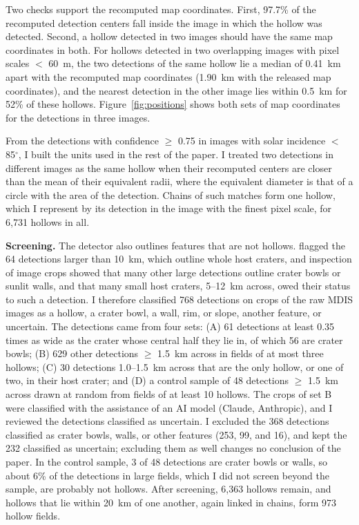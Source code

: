 \documentclass{planetary}
\begin{document}
Two checks support the recomputed map coordinates. First, 97.7\% of the recomputed detection centers fall inside the image in which the hollow was detected. Second, a hollow detected in two images should have the same map coordinates in both. For hollows detected in two overlapping images with pixel scales $<$ 60~m, the two detections of the same hollow lie a median of 0.41~km apart with the recomputed map coordinates (1.90~km with the released map coordinates), and the nearest detection in the other image lies within 0.5~km for 52\% of these hollows. Figure~\ref{fig:positions} shows both sets of map coordinates for the detections in three images.

From the detections with confidence $\geq$ 0.75 in images with solar incidence $<$ 85$^\circ$, I built the units used in the rest of the paper. I treated two detections in different images as the same hollow when their recomputed centers are closer than the mean of their equivalent radii, where the equivalent diameter is that of a circle with the area of the detection. Chains of such matches form one hollow, which I represent by its detection in the image with the finest pixel scale, for 6,731 hollows in all.

\textbf{Screening.} The detector also outlines features that are not hollows. \textcite{bickel2025} flagged the 64 detections larger than 10~km, which outline whole host craters, and inspection of image crops showed that many other large detections outline crater bowls or sunlit walls, and that many small host craters, 5--12~km across, owed their status to such a detection. I therefore classified 768 detections on crops of the raw MDIS images as a hollow, a crater bowl, a wall, rim, or slope, another feature, or uncertain. The detections came from four sets: (A) 61 detections at least 0.35 times as wide as the crater whose central half they lie in, of which 56 are crater bowls; (B) 629 other detections $\geq$ 1.5~km across in fields of at most three hollows; (C) 30 detections 1.0--1.5~km across that are the only hollow, or one of two, in their host crater; and (D) a control sample of 48 detections $\geq$ 1.5~km across drawn at random from fields of at least 10 hollows. The crops of set B were classified with the assistance of an AI model (Claude, Anthropic), and I reviewed the detections classified as uncertain. I excluded the 368 detections classified as crater bowls, walls, or other features (253, 99, and 16), and kept the 232 classified as uncertain; excluding them as well changes no conclusion of the paper. In the control sample, 3 of 48 detections are crater bowls or walls, so about 6\% of the detections in large fields, which I did not screen beyond the sample, are probably not hollows. After screening, 6,363 hollows remain, and hollows that lie within 20~km of one another, again linked in chains, form 973 hollow fields.
\end{document}
